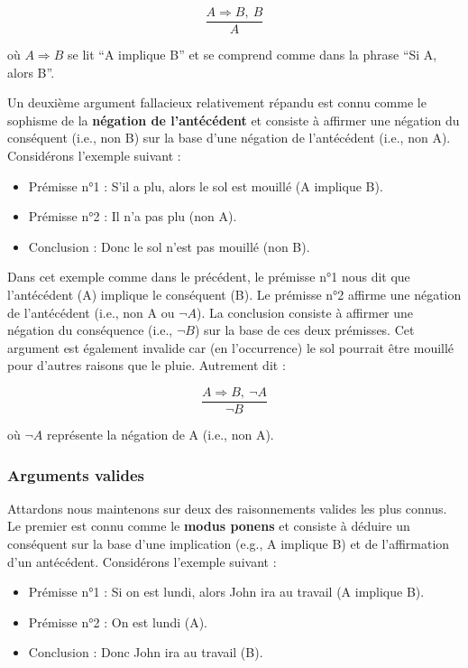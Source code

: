 \documentclass[
  a4paper,11pt,twoside,onecolumn,openright,final,oldfontcommands]{memoir}
\providecommand{\tightlist}{%
  \setlength{\itemsep}{0pt}\setlength{\parskip}{0pt}}
\theoremstyle{definition}
\theoremstyle{definition}
\theoremstyle{definition}
\theoremstyle{definition}
\theoremstyle{remark}
\begin{document}
\[\dfrac{A \Rightarrow B, \ B}{A}\]

où \(A \Rightarrow B\) se lit ``A implique B'' et se comprend comme dans la phrase ``Si A, alors B''.

Un deuxième argument fallacieux relativement répandu est connu comme le sophisme de la \textbf{négation de l'antécédent} et consiste à affirmer une négation du conséquent (i.e., non B) sur la base d'une négation de l'antécédent (i.e., non A). Considérons l'exemple suivant :

\begin{itemize}
\tightlist
\item
  Prémisse n°1 : S'il a plu, alors le sol est mouillé (A implique B).
\item
  Prémisse n°2 : Il n'a pas plu (non A).
\item
  Conclusion : Donc le sol n'est pas mouillé (non B).
\end{itemize}

Dans cet exemple comme dans le précédent, le prémisse n°1 nous dit que l'antécédent (A) implique le conséquent (B). Le prémisse n°2 affirme une négation de l'antécédent (i.e., non A ou \(\neg A\)). La conclusion consiste à affirmer une négation du conséquence (i.e., \(\neg B\)) sur la base de ces deux prémisses. Cet argument est également invalide car (en l'occurrence) le sol pourrait être mouillé pour d'autres raisons que le pluie. Autrement dit :

\[\dfrac{A \Rightarrow B, \ \neg A}{\neg B}\]

où \(\neg A\) représente la négation de A (i.e., non A).

\hypertarget{arguments-valides}{%
\subsubsection{Arguments valides}\label{arguments-valides}}

Attardons nous maintenons sur deux des raisonnements valides les plus connus. Le premier est connu comme le \textbf{modus ponens} et consiste à déduire un conséquent sur la base d'une implication (e.g., A implique B) et de l'affirmation d'un antécédent. Considérons l'exemple suivant :

\begin{itemize}
\tightlist
\item
  Prémisse n°1 : Si on est lundi, alors John ira au travail (A implique B).
\item
  Prémisse n°2 : On est lundi (A).
\item
  Conclusion : Donc John ira au travail (B).
\end{itemize}
\end{document}
